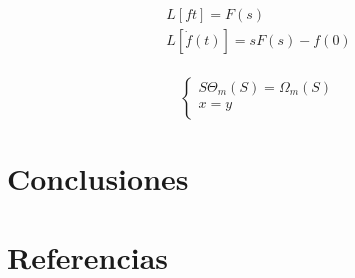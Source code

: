 \documentclass{article}
\begin{document}
\begin{equation}
    \begin{aligned}
        L[f{t}] = F(s)\\
        L[\dot{f}(t)] = s F(s) - f(0)\\
    \end{aligned}
\end{equation}

\begin{equation}
    \begin{cases}
        S\Theta_{m}(S) = \Omega_{m}(S)\\
        x = y\\
    \end{cases}
\end{equation}

\newpage
\part*{Conclusiones}

\newpage
\part*{Referencias}
\lipsum{}
\label{LastPage}    
\end{document}
